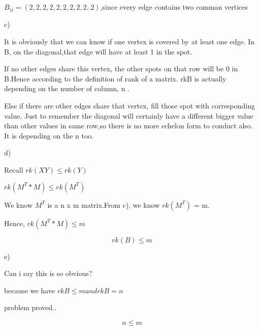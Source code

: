 \documentclass{article}
\begin{document}
$B_{ij} = (2,2,2,2,2,2,2,2,2..2)$,since every edge contains two comman vertices

c)

It is obviously that we can know if one vertex is covered by at least one edge. In B, on the diagonal,that edge will have at least 1 in the spot.

If no other edges share this vertex, the other spots on that row will be 0 in B.Hence according to the definition of rank of a matrix. rkB is actually depending on the number of column, n .

Else if there are other edges share that vertex, fill those spot with corresponding value. Just to remember the diagonal will certainly have a different bigger value than other values in same row,so there is no more echelon form to conduct also. It is depending on the n too.

d)

Recall $rk(XY) \leq rk(Y)$
 
$rk(M^T*M) \leq rk(M^T)$

We know $M^T$ is a n x m matrix.From c), we
know $rk(M^T)$ = m.

Hence, $rk(M^T*M) \leq m$

$$rk(B) \leq m$$

e)

Can i say this is so obvious?

because we have $rk B \leq m and rk B = n$

problem proved..

$$n \leq m$$
\end{document}
